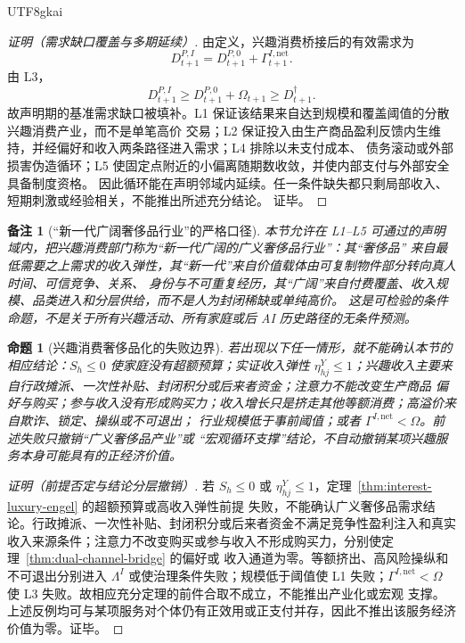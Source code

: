 \documentclass[12pt,a4paper,openany]{report}
\newtheorem{proposition}{命题}[chapter]
\newtheorem{remark}{备注}[chapter]
\begin{document}
\begin{CJK*}{UTF8}{gkai}
\begin{proof}[证明（需求缺口覆盖与多期延续）]
由定义，兴趣消费桥接后的有效需求为
\[
  D_{t+1}^{P,I}
  =D_{t+1}^{P,0}+\Gamma_{t+1}^{I,\mathrm{net}}.
\]
由 L3，
\[
  D_{t+1}^{P,I}
  \ge D_{t+1}^{P,0}+\Omega_{t+1}
  \ge D_{t+1}^{\dagger}.
\]
故声明期的基准需求缺口被填补。L1 保证该结果来自达到规模和覆盖阈值的分散兴趣消费产业，而不是单笔高价
交易；L2 保证投入由生产商品盈利反馈内生维持，并经偏好和收入两条路径进入需求；L4 排除以未支付成本、
债务滚动或外部损害伪造循环；L5 使固定点附近的小偏离随期数收敛，并使内部支付与外部安全具备制度资格。
因此循环能在声明邻域内延续。任一条件缺失都只剩局部收入、短期刺激或经验相关，不能推出所述充分结论。
证毕。
\end{proof}

\begin{remark}[“新一代广阔奢侈品行业”的严格口径]
本节允许在 L1--L5 可通过的声明域内，把兴趣消费部门称为“新一代广阔的广义奢侈品行业”：其“奢侈品”
来自最低需要之上需求的收入弹性，其“新一代”来自价值载体由可复制物件部分转向真人时间、可信竞争、关系、
身份与不可重复经历，其“广阔”来自付费覆盖、收入规模、品类进入和分层供给，而不是人为封闭稀缺或单纯高价。
这是可检验的条件命题，不是关于所有兴趣活动、所有家庭或后 AI 历史路径的无条件预测。
\end{remark}

\begin{proposition}[兴趣消费奢侈品化的失败边界]
\label{prop:interest-luxury-failure-boundary}
若出现以下任一情形，就不能确认本节的相应结论：\(S_h\le0\) 使家庭没有超额预算；实证收入弹性
\(\eta_{hj}^{Y}\le1\)；兴趣收入主要来自行政摊派、一次性补贴、封闭积分或后来者资金；注意力不能改变生产商品
偏好与购买；参与收入没有形成购买力；收入增长只是挤走其他等额消费；高溢价来自欺诈、锁定、操纵或不可退出；
行业规模低于事前阈值；或者 \(\Gamma^{I,\mathrm{net}}<\Omega\)。前述失败只撤销“广义奢侈品产业”或
“宏观循环支撑”结论，不自动撤销某项兴趣服务本身可能具有的正经济价值。
\end{proposition}

\begin{proof}[证明（前提否定与结论分层撤销）]
若 \(S_h\le0\) 或 \(\eta_{hj}^{Y}\le1\)，定理~\ref{thm:interest-luxury-engel} 的超额预算或高收入弹性前提
失败，不能确认广义奢侈品需求结论。行政摊派、一次性补贴、封闭积分或后来者资金不满足竞争性盈利注入和真实
收入来源条件；注意力不改变购买或参与收入不形成购买力，分别使定理~\ref{thm:dual-channel-bridge} 的偏好或
收入通道为零。等额挤出、高风险操纵和不可退出分别进入 \(\Lambda^{I}\) 或使治理条件失败；规模低于阈值使 L1
失败；\(\Gamma^{I,\mathrm{net}}<\Omega\) 使 L3 失败。故相应充分定理的前件合取不成立，不能推出产业化或宏观
支撑。上述反例均可与某项服务对个体仍有正效用或正支付并存，因此不推出该服务经济价值为零。证毕。
\end{proof}


\end{CJK*}
\end{document}
